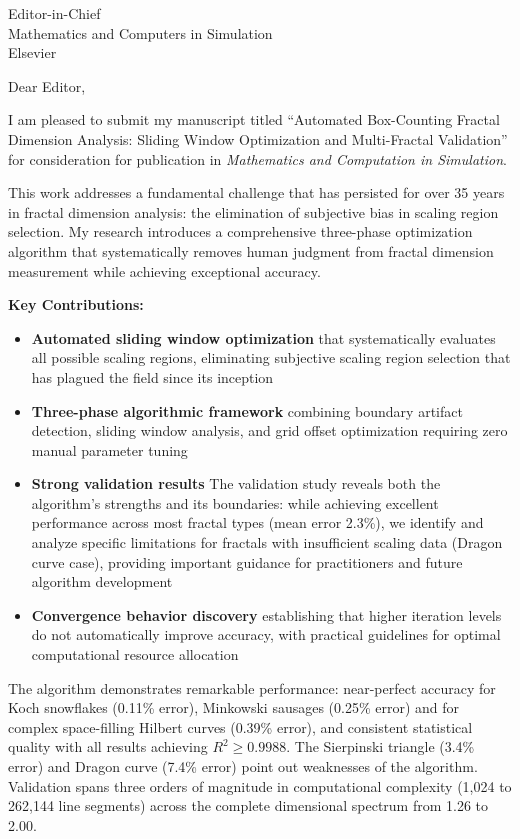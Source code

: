 \documentclass[11pt]{letter}
\begin{document}
\begin{letter}{Editor-in-Chief\\
Mathematics and Computers in Simulation\\
Elsevier}

\opening{Dear Editor,}

I am pleased to submit my manuscript titled ``Automated Box-Counting Fractal Dimension Analysis: Sliding Window Optimization and Multi-Fractal Validation'' for consideration for publication in \emph{Mathematics and Computation in Simulation}.

This work addresses a fundamental challenge that has persisted for over 35 years in fractal dimension analysis: the elimination of subjective bias in scaling region selection. My research introduces a comprehensive three-phase optimization algorithm that systematically removes human judgment from fractal dimension measurement while achieving exceptional accuracy.

\textbf{Key Contributions:}
\begin{itemize}
\item \textbf{Automated sliding window optimization} that systematically evaluates all possible scaling regions, eliminating subjective scaling region selection that has plagued the field since its inception
\item \textbf{Three-phase algorithmic framework} combining boundary artifact detection, sliding window analysis, and grid offset optimization requiring zero manual parameter tuning
\item \textbf{Strong validation results} The validation study reveals both the algorithm's strengths and its boundaries: while achieving excellent performance across most fractal types (mean error 2.3\%), we identify and analyze specific limitations for fractals with insufficient scaling data (Dragon curve case), providing important guidance for practitioners and future algorithm development
\item \textbf{Convergence behavior discovery} establishing that higher iteration levels do not automatically improve accuracy, with practical guidelines for optimal computational resource allocation
\end{itemize}

The algorithm demonstrates remarkable performance: near-perfect accuracy for Koch snowflakes (0.11\% error), Minkowski sausages (0.25\% error) and for complex space-filling Hilbert curves (0.39\% error), and consistent statistical quality with all results achieving $R^2 \geq 0.9988$. The Sierpinski triangle (3.4\% error) and Dragon curve (7.4\% error) point out weaknesses of the algorithm.  Validation spans three orders of magnitude in computational complexity (1,024 to 262,144 line segments) across the complete dimensional spectrum from 1.26 to 2.00.


\end{letter}
\end{document}

